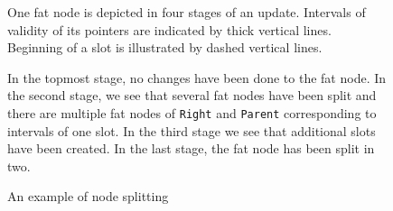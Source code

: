 \begin{figure}
\begin{center}
\vspace{10mm}
\end{center}
{
	\small
	One fat node is depicted in four stages of an update. Intervals of validity of its pointers are indicated by thick vertical lines. Beginning of a slot is illustrated by dashed vertical lines.

	In the topmost stage, no changes have been done to the fat node. In the second stage, we see that several fat nodes have been split and there are multiple fat nodes of {\tt Right} and {\tt Parent} corresponding to intervals of one slot. In the third stage we see that additional slots have been created. In the last stage, the fat node has been split in two.
}
\caption{An example of node splitting}
\end{figure}